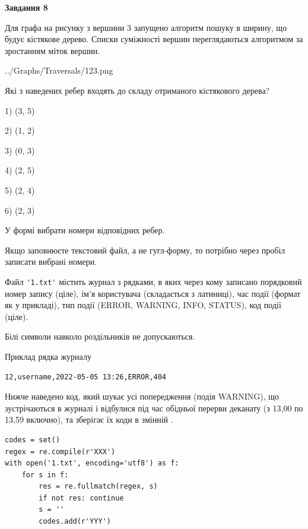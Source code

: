 \documentclass[12pt, ukrainian]{article}
\def\code#1{\Verb!#1!}
\begin{document}
{\begin {large}
{\begin {center}\textbf{Завдання 8}\end {center}}\par
Для графа на рисунку з вершини 3 запущено алгоритм пошуку в ширину, що будує кістякове дерево. Списки суміжності вершин переглядаються алгоритмом за зростанням міток вершин.\par
\begin{center}
	{../Graphs/Traversals/123.png}
\end{center}
\par Які з наведених ребер входять до складу отриманого кістякового дерева?\par
1) (3, 5)\par
2) (1, 2)\par
3) (0, 3)\par
4) (2, 5)\par
5) (2, 4)\par
6) (2, 3)\par
{\vskip 15pt} У формі вибрати номери відповідних ребер.


Якщо заповнюєте текстовий файл, а не гугл-форму, то потрібно через пробіл записа\-ти вибрані номери.\par
\newpage


Файл \code{'1.txt'} містить журнал з рядками, в яких через кому записано поряд\-ко\-вий номер запису (ціле), ім'я користувача (складається з латиниці), час події (фор\-мат як у прикладі), тип події (ERROR, WARNING, INFO, STATUS), код події (ціле).

Білі символи навколо роздільників не допускаються.

Приклад рядка журналу



\begin{verbatim}
12,username,2022-05-05 13:26,ERROR,404
\end{verbatim}


Нижче наведено код, який шукає усі попередження (подія WARNING), що зустрі\-ча\-ються в журналі і відбулися під час обідньої перерви деканату (з 13,00 по 13,59 включно), та зберігає їх коди в змінній .



\begin{verbatim}
codes = set()
regex = re.compile(r'XXX')
with open('1.txt', encoding='utf8') as f:
    for s in f:
        res = re.fullmatch(regex, s)
        if not res: continue
        s = ''
        codes.add(r'YYY')
\end{verbatim}





\end{large}}
\end{document}
